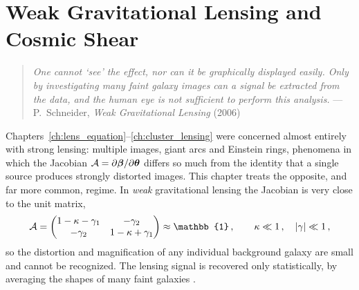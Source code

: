 
\chapter{Weak Gravitational Lensing and Cosmic Shear}
\label{ch:weak_lensing}

\begin{quote}
\textit{One cannot `see' the effect, nor can it be graphically displayed
easily.  Only by investigating many faint galaxy images can a signal be
extracted from the data, and the human eye is not sufficient to perform
this analysis.}
\hfill --- P.~Schneider, \textit{Weak Gravitational Lensing} (2006)
\end{quote}

\noindent
Chapters~\ref{ch:lens_equation}--\ref{ch:cluster_lensing} were concerned
almost entirely with strong lensing: multiple images, giant
arcs and Einstein rings, phenomena in which the Jacobian
$\mathcal{A} = \partial\boldsymbol{\beta}/\partial\boldsymbol{\theta}$ differs so much from the
identity that a single source produces strongly distorted images.
This chapter treats the opposite, and far more common, regime.  In
\emph{weak} gravitational lensing the Jacobian is very close to the
unit matrix,
\begin{equation*}
    \Amat = \begin{pmatrix} 1 - \kappab - \gammaL_1 & -\gammaL_2 \\
    -\gammaL_2 & 1 - \kappab + \gammaL_1 \end{pmatrix}
    \approx \mathbb{1}\,,
    \qquad \kappab \ll 1\,, \quad |\gammaL| \ll 1\,,
\end{equation*}
so the distortion and magnification of any individual background
galaxy are small and cannot be recognized.  The lensing signal is
recovered only statistically, by averaging the shapes of many
faint galaxies \citep{schneider_kochanek_wambsganss_2006}.


